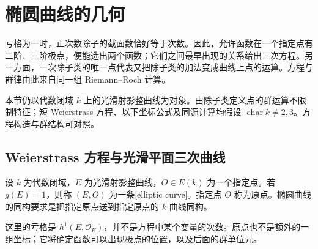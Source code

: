 
\section{椭圆曲线的几何}
\label{b3:sec:H04}

亏格为一时，正次数除子的截面数恰好等于次数。因此，允许函数在一个指定点有二阶、三阶极点，便能选出两个函数；它们之间最早出现的关系给出三次方程。另一方面，一次除子类的唯一点代表又把除子类的加法变成曲线上点的运算。方程与群律由此来自同一组 Riemann--Roch 计算。

\ProseParagraphBreak
本节仍以代数闭域 \(k\) 上的光滑射影整曲线为对象。由除子类定义点的群运算不限制特征；短 Weierstrass 方程、以下坐标公式及同源计算均假设 \(\operatorname{char}k\ne2,3\)。方程构造与群结构可对照\cite[Chapter IV, Proposition 4.6, Proposition 4.8, pp. 319--322]{Hartshorne1977}。

\subsection{Weierstrass 方程与光滑平面三次曲线}
\label{b3:subsec:H04:01}

\begin{definition}\label{b3:def:H-elliptic-curve}
	设 \(k\) 为代数闭域，\(E\) 为光滑射影整曲线，\(O\in E(k)\) 为一个指定点。若 \(g(E)=1\)，则称 \((E,O)\) 为一条[elliptic curve]。指定点 \(O\) 称为原点。椭圆曲线的同构要求是把指定原点送到指定原点的 \(k\) 曲线同构。
\end{definition}

这里的亏格是 \(h^1(E,\mathcal O_E)\)，并不是方程中某个变量的次数。原点也不是额外的一组坐标；它将确定函数可以出现极点的位置，以及后面的群单位元。

